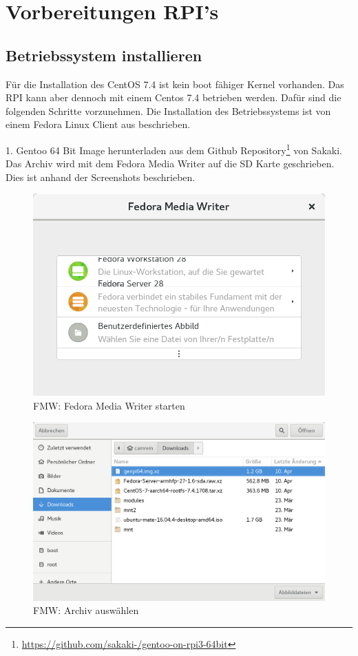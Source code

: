 \section{Vorbereitungen RPI's}
\subsection{Betriebssystem installieren}
Für die Installation des CentOS 7.4 ist kein boot fähiger Kernel vorhanden. Das RPI kann aber dennoch mit einem Centos 7.4 betrieben werden. Dafür sind die folgenden Schritte vorzunehmen. Die Installation des Betriebssystems ist von einem Fedora Linux Client aus beschrieben.

1. Gentoo 64 Bit Image herunterladen aus dem Github Repository\footnote{\url{https://github.com/sakaki-/gentoo-on-rpi3-64bit}} von Sakaki. Das Archiv wird mit dem Fedora Media Writer auf die SD Karte geschrieben. Dies ist anhand der Screenshots beschrieben. \newline
\begin{figure}[H]
	\centering
	\includegraphics[scale=0.3]{Bilder/fmw1.png}
	\caption{FMW: Fedora Media Writer starten}
\end{figure}
\begin{figure}[H]
	\centering
	\includegraphics[scale=0.2]{Bilder/fmw2.png}
	\caption{FMW: Archiv auswählen}
\end{figure}
